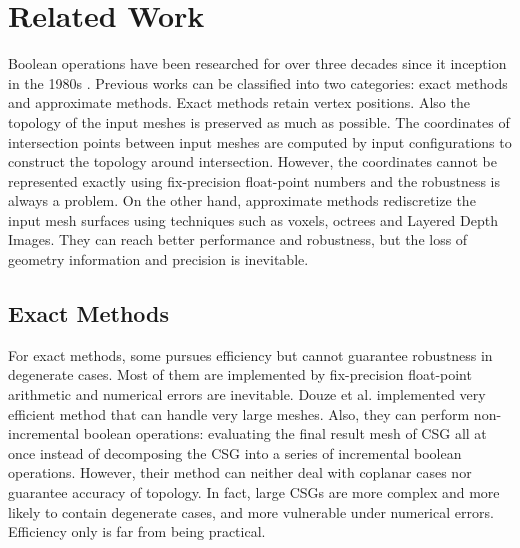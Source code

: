\documentclass[10pt,journal,compsoc]{IEEEtran}
\begin{document}
\section{Related Work}

Boolean operations have been researched for over three decades since it inception in the 1980s \cite{requicha1985boolean, laidlaw1986constructive}. Previous works can be classified into two categories: exact methods and approximate methods. Exact methods retain vertex positions. Also the topology of the input meshes is preserved as much as possible. The coordinates of intersection points between input meshes are computed by input configurations to construct the topology around intersection. However, the coordinates cannot be represented exactly using fix-precision float-point numbers and the robustness is always a problem. On the other hand, approximate methods rediscretize the input mesh surfaces using techniques such as voxels, octrees and Layered Depth Images. They can reach better performance and robustness, but the loss of geometry information and precision is inevitable.

\subsection{Exact Methods}

For exact methods, some \cite{ogayar2015deferred,douze2015quickcsg,zhou2016mesh,xu2013fast,feito2013fast} pursues efficiency but cannot guarantee robustness in degenerate cases. Most of them are implemented by fix-precision float-point arithmetic and numerical errors are inevitable. Douze et al. \cite{douze2015quickcsg} implemented very efficient method that can handle very large meshes. Also, they can perform non-incremental boolean operations: evaluating the final result mesh of CSG all at once instead of decomposing the CSG into a series of incremental boolean operations. However, their method can neither deal with coplanar cases nor guarantee accuracy of topology. In fact, large CSGs are more complex and more likely to contain degenerate cases, and more vulnerable under numerical errors. Efficiency only is far from being practical.
\end{document}
